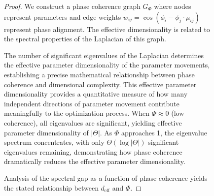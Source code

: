 \begin{figure}[ht]
\begin{proof}
We construct a phase coherence graph $G_{\Phi}$ where nodes represent parameters and edge weights $w_{ij} = \cos(\phi_i - \phi_j \cdot \mu_{ij})$ represent phase alignment. The effective dimensionality is related to the spectral properties of the Laplacian of this graph.

The number of significant eigenvalues of the Laplacian determines the effective parameter dimensionality of the parameter movements, establishing a precise mathematical relationship between phase coherence and dimensional complexity. This effective parameter dimensionality provides a quantitative measure of how many independent directions of parameter movement contribute meaningfully to the optimization process. When $\Phi \approx 0$ (low coherence), all eigenvalues are significant, yielding effective parameter dimensionality of $|\Theta|$. As $\Phi$ approaches 1, the eigenvalue spectrum concentrates, with only $\Theta(\log |\Theta|)$ significant eigenvalues remaining, demonstrating how phase coherence dramatically reduces the effective parameter dimensionality.

Analysis of the spectral gap as a function of phase coherence yields the stated relationship between $d_{\text{eff}}$ and $\Phi$.
\end{proof}

\begin{figure}[ht]
\centering
{}
\end{figure}
\end{figure}
